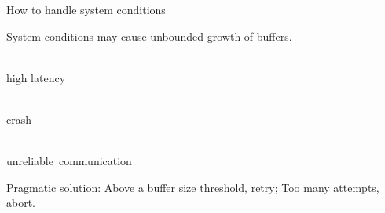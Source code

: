 \documentclass[10pt, xcolor={usenames, dvipsnames}]{beamer}
\begin{document}
\begin{frame}{How to handle system conditions}

  System conditions may cause unbounded growth of buffers.

  \begin{minipage}{0.32\textwidth}
    \begin{center}
      \\
      \small high latency
    \end{center}
  \end{minipage}
  \begin{minipage}{0.32\textwidth}
    \begin{center}
      \\
      \small crash
    \end{center}
  \end{minipage}
  \begin{minipage}{0.32\textwidth}
    \vspace{-1em}
    \begin{center}
      \\
      \small unreliable~communication
    \end{center}
  \end{minipage}
  
  \vspace{1em}

  Pragmatic solution: Above a buffer size threshold, retry; Too many attempts,
  abort.

  \vspace{-1em}

  \begin{minipage}{0.32\textwidth}
    \vspace{16pt}
    \begin{center}
      
    \end{center}
  \end{minipage}
  \begin{minipage}{0.32\textwidth}
    \vspace{12pt}
    \begin{center}
      
    \end{center}
  \end{minipage}
  \begin{minipage}{0.32\textwidth}
    \begin{center}
      
    \end{center}
  \end{minipage}
  

\end{frame}
\end{document}
